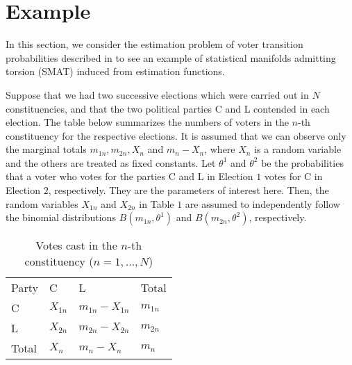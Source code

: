 \documentclass[graybox]{svmult}
\begin{document}
\section{Example}
\label{sec:6}
In this section, we consider the estimation problem of voter transition probabilities 
described in \cite{MN} to see an example of statistical manifolds admitting torsion (SMAT) 
induced from estimation functions.

Suppose that we had two successive elections which were carried out in $N$ constituencies,
and that the two political parties C and L contended in each election.
The table below summarizes the numbers of voters in the $n$-th constituency for the respective
elections. It is assumed that we can observe only the marginal totals $m_{1n}, m_{2n}, X_n$
and $m_n-X_n$, where $X_n$ is a random variable and the others are treated as fixed constants.
Let $\theta^1$ and $\theta^2$ be the probabilities that a voter who votes for the parties
C and L in Election $1$ votes for C in Election $2$, respectively. They are the parameters
of interest here. Then, the random variables $X_{1n}$ and $X_{2n}$ in Table $1$ are assumed to 
independently follow the binomial distributions $B(m_{1n},\theta^1)$ and $B(m_{2n},\theta^2)$, 
respectively.

\begin{table}
\begin{center}
\caption{Votes cast in the $n$-th constituency ($n=1,\ldots,N$)}
\label{tab:1}
\begin{tabular}{p{2cm}p{2cm}p{2cm}p{0.6cm}}
Party & C & L & Total \\ 
\noalign{\smallskip}\hline\noalign{\smallskip}
C & $X_{1n}$ & $m_{1n}-X_{1n}$ & $m_{1n}$ \\
\noalign{\smallskip}\hline\noalign{\smallskip}
L & $X_{2n}$ & $m_{2n}-X_{2n}$ & $m_{2n}$ \\
\noalign{\smallskip}\hline\noalign{\smallskip}
Total & $X_n$ & $m_n-X_n$ & $m_n$ \\
\end{tabular}
\end{center}
\end{table}
\end{document}
